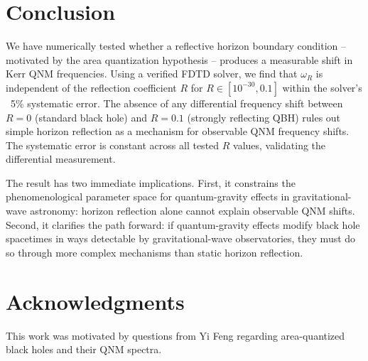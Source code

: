 \documentclass[10pt,amsmath,amssymb,amsfonts]{article}
\begin{document}
\section{Conclusion}

We have numerically tested whether a reflective horizon boundary condition -- motivated by the area quantization hypothesis -- produces a measurable shift in Kerr QNM frequencies. Using a verified FDTD solver, we find that $\omega_R$ is independent of the reflection coefficient $R$ for $R \in [10^{-30}, 0.1]$ within the solver's ~5\% systematic error. The absence of any differential frequency shift between $R=0$ (standard black hole) and $R=0.1$ (strongly reflecting QBH) rules out simple horizon reflection as a mechanism for observable QNM frequency shifts. The systematic error is constant across all tested $R$ values, validating the differential measurement.

The result has two immediate implications. First, it constrains the phenomenological parameter space for quantum-gravity effects in gravitational-wave astronomy: horizon reflection alone cannot explain observable QNM shifts. Second, it clarifies the path forward: if quantum-gravity effects modify black hole spacetimes in ways detectable by gravitational-wave observatories, they must do so through more complex mechanisms than static horizon reflection.

\section*{Acknowledgments}

This work was motivated by questions from Yi Feng regarding area-quantized black holes and their QNM spectra.


\end{document}
